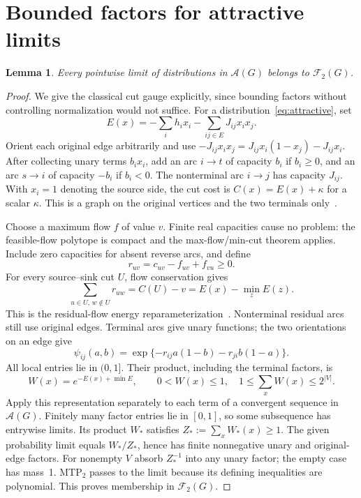 \documentclass[11pt]{article}
\newtheorem{lemma}[theorem]{Lemma}
\newcommand{\F}{\mathcal F_2(G)}
\newcommand{\A}{\mathcal A(G)}
\begin{document}
\section{Bounded factors for attractive limits}
\begin{lemma}\label{lem:compact}
Every pointwise limit of distributions in $\A$ belongs to $\F$.
\end{lemma}
\begin{proof}
We give the classical cut gauge explicitly, since bounding factors without controlling normalization would not suffice. For a distribution~\eqref{eq:attractive}, set
\[
 E(x)=-\sum_i h_i x_i-\sum_{ij\in E}J_{ij}x_ix_j.
\]
Orient each original edge arbitrarily and use
$-J_{ij}x_ix_j=J_{ij}x_i(1-x_j)-J_{ij}x_i$.
After collecting unary terms $b_i x_i$, add an arc $i\to t$ of capacity $b_i$ if $b_i\geq0$, and an arc $s\to i$ of capacity $-b_i$ if $b_i<0$. The nonterminal arc $i\to j$ has capacity $J_{ij}$. With $x_i=1$ denoting the source side, the cut cost is $C(x)=E(x)+\kappa$ for a scalar $\kappa$. This is a graph on the original vertices and the two terminals only~\cite{KZ2004}.

Choose a maximum flow $f$ of value $v$. Finite real capacities cause no problem: the feasible-flow polytope is compact and the max-flow/min-cut theorem applies. Include zero capacities for absent reverse arcs, and define
\[
 r_{uv}=c_{uv}-f_{uv}+f_{vu}\geq0.
\]
For every source--sink cut $U$, flow conservation gives
\begin{equation}\label{eq:residual}
 \sum_{u\in U,\,w\notin U}r_{uw}=C(U)-v
 =E(x)-\min_z E(z).
\end{equation}
This is the residual-flow energy reparameterization~\cite{PQ1979,KR2007}. Nonterminal residual arcs still use original edges. Terminal arcs give unary functions; the two orientations on an edge give
\[
 \psi_{ij}(a,b)=\exp\{-r_{ij}a(1-b)-r_{ji}b(1-a)\}.
\]
All local entries lie in $(0,1]$. Their product, including the terminal factors, is
\[
 W(x)=e^{-E(x)+\min E},\qquad 0<W(x)\leq1,
 \quad 1\leq\sum_x W(x)\leq2^{|V|}.
\]
Apply this representation separately to each term of a convergent sequence in $\A$. Finitely many factor entries lie in $[0,1]$, so some subsequence has entrywise limits. Its product $W_*$ satisfies $Z_*:=\sum_xW_*(x)\geq1$. The given probability limit equals $W_*/Z_*$, hence has finite nonnegative unary and original-edge factors. For nonempty $V$ absorb $Z_*^{-1}$ into any unary factor; the empty case has mass~1. MTP$_2$ passes to the limit because its defining inequalities are polynomial. This proves membership in $\F$.
\end{proof}
\end{document}
